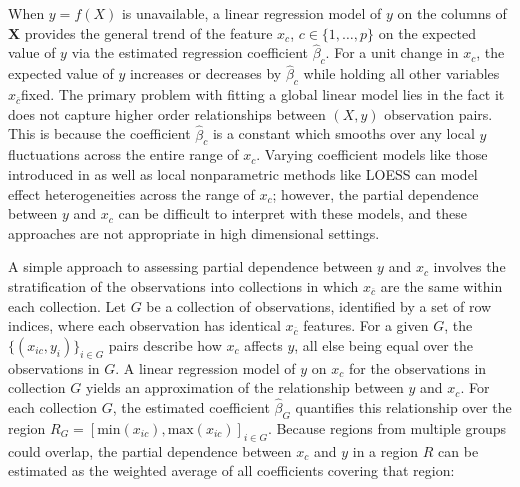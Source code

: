 \documentclass[12pt]{article}
\newcommand{\cut}[1]{}
\newcommand{\xnc}{$x_{\overline{c}}$}
\begin{document}
\cut{The partial derivative of $f(X)$ with respect to a single variable of interest $x_c$ describes how a unit change in $x_c$ affects $y$ for all $x_c$ values, treating all other variables as constants. Integrating the partial derivative $\frac{\partial}{\partial x_{c}} f(X)$ would yield a curve showing just $x_c$'s contribution to $y$. } When $y = f(X)$ is unavailable, a linear regression model of $y$ on the columns of $\mathbf{X}$ provides the general trend of the feature $x_c$, $c \in \{1, \ldots, p\}$ on the expected value of $y$ via the estimated regression coefficient $\widehat{\beta}_c$. For a unit change in $x_c$, the expected value of $y$ increases or decreases by $\widehat{\beta}_c$ while holding all other variables \xnc fixed. The primary problem with fitting a global linear model lies in the fact it does not capture higher order relationships between $(X,y)$ observation pairs. This is because the coefficient $\widehat{\beta}_c$ is a constant which smooths over any local $y$ fluctuations across the entire range of $x_c$. Varying coefficient models like those introduced in \citet{fan2008statistical} as well as local nonparametric methods like LOESS \citep{cleveland1979robust, cleveland1981lowess, cleveland1988locally} can model effect heterogeneities across the range of $x_c$; however, the partial dependence between $y$ and $x_c$ can be difficult to interpret with these models, and these approaches are not appropriate in high dimensional settings. \cut{Second, linear models require dummy variables to represent (and replace) categorical $x_c$ variables, therefore, regression coefficients would describe the relationship between the presence or absence of a single category and $y$, rather than $x_c$ and $y$. \color{red} Although I agree that categorical variables are an important consideration, many stats folks would not agree with this statement and are perfectly happy with its interpretation.}

A simple approach to assessing partial dependence between $y$ and $x_c$ involves the stratification of the observations into collections in which \xnc{} are the same within each collection. Let $G$ be a collection of observations, identified by a set of row indices, where each observation has identical \xnc{} features. For a given $G$, the $\{(x_{ic},  y_i)\}_{i \in G}$ pairs describe how $x_c$ affects $y$, all else being equal over the observations in $G$. A linear regression model of $y$ on $x_c$ for the observations in collection $G$ yields an approximation of the relationship between $y$ and $x_c$. For each collection $G$, the estimated coefficient $\widehat{\beta}_G$ quantifies this relationship over the region $R_G = [\text{min}(x_{ic}), \text{max}(x_{ic})]_{i \in G}$. Because regions from multiple groups could overlap, the partial dependence between $x_c$ and $y$ in a region $R$ can be estimated as the weighted average of all coefficients covering that region: 
\end{document}
